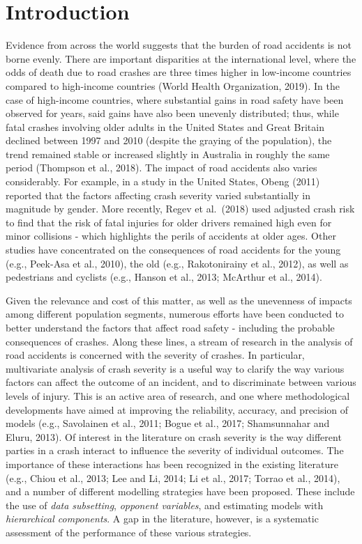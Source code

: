 \documentclass[]{elsarticle} %
\begin{document}
\hypertarget{introduction}{%
\section{Introduction}\label{introduction}}

Evidence from across the world suggests that the burden of road
accidents is not borne evenly. There are important disparities at the
international level, where the odds of death due to road crashes are
three times higher in low-income countries compared to high-income
countries (World Health Organization, 2019). In the case of high-income
countries, where substantial gains in road safety have been observed for
years, said gains have also been unevenly distributed; thus, while fatal
crashes involving older adults in the United States and Great Britain
declined between 1997 and 2010 (despite the graying of the population),
the trend remained stable or increased slightly in Australia in roughly
the same period (Thompson et al., 2018). The impact of road accidents
also varies considerably. For example, in a study in the United States,
Obeng (2011) reported that the factors affecting crash severity varied
substantially in magnitude by gender. More recently, Regev et al.~(2018)
used adjusted crash risk to find that the risk of fatal injuries for
older drivers remained high even for minor collisions - which highlights
the perils of accidents at older ages. Other studies have concentrated
on the consequences of road accidents for the young (e.g., Peek-Asa et
al., 2010), the old (e.g., Rakotonirainy et al., 2012), as well as
pedestrians and cyclists (e.g., Hanson et al., 2013; McArthur et al.,
2014).

Given the relevance and cost of this matter, as well as the unevenness
of impacts among different population segments, numerous efforts have
been conducted to better understand the factors that affect road safety
- including the probable consequences of crashes. Along these lines, a
stream of research in the analysis of road accidents is concerned with
the severity of crashes. In particular, multivariate analysis of crash
severity is a useful way to clarify the way various factors can affect
the outcome of an incident, and to discriminate between various levels
of injury. This is an active area of research, and one where
methodological developments have aimed at improving the reliability,
accuracy, and precision of models (e.g., Savolainen et al., 2011; Bogue
et al., 2017; Shamsunnahar and Eluru, 2013). Of interest in the
literature on crash severity is the way different parties in a crash
interact to influence the severity of individual outcomes. The
importance of these interactions has been recognized in the existing
literature (e.g., Chiou et al., 2013; Lee and Li, 2014; Li et al., 2017;
Torrao et al., 2014), and a number of different modelling strategies
have been proposed. These include the use of \emph{data subsetting},
\emph{opponent variables}, and estimating models with \emph{hierarchical
components}. A gap in the literature, however, is a systematic
assessment of the performance of these various strategies.
\end{document}
